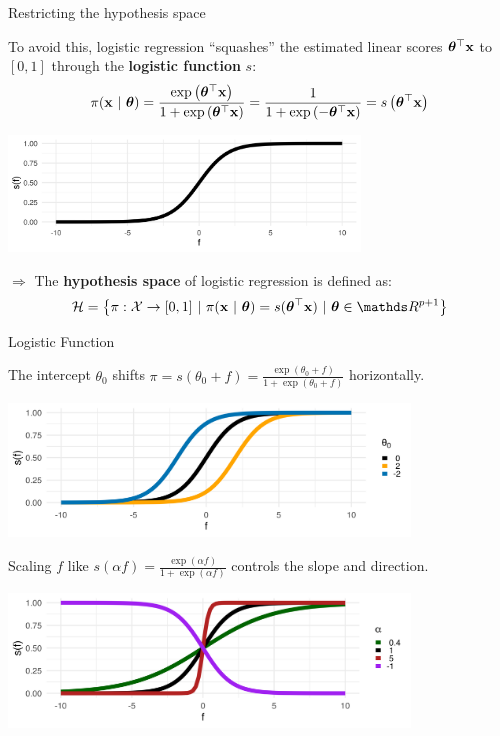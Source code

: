 \documentclass[11pt,compress,t,notes=noshow, xcolor=table]{beamer}
\begin{document}
\begin{vbframe}{Restricting the hypothesis space}

To avoid this, logistic regression \enquote{squashes} the estimated linear scores $\bm{\theta}^\top \mathbf{x}$ to $[0,1]$ through the \textbf{logistic function} $s$:
\[
\pi(\mathbf{x}~|~ \bm{\theta}) = \frac{\exp\left( \bm{\theta}^\top \mathbf{x} \right)}{1+\exp\left(\bm{\theta}^\top \mathbf{x} \right)} = \frac{1}{1+\exp\left( -\bm{\theta}^\top \mathbf{x} \right)} = s\left( \bm{\theta}^\top \mathbf{x} \right)
\]

\begin{center}
  \includegraphics[width=0.70\textwidth]{figure/logistic_function.png} 
\end{center}

$\Rightarrow$ The \textbf{hypothesis space} of logistic regression is defined as:
\begin{eqnarray*}
  \Hspace = \left\{\pi: \Xspace \to [0,1] ~|~\pixt = s(\thx) ~|~ \thetav \in \R^{p+1} \right\}
\end{eqnarray*}

\end{vbframe}

\begin{vbframe}{Logistic Function}

The intercept $\theta_0$ shifts $\pi = s(\theta_0 + f) = \frac{\exp(\theta_0 + f)}{1+\exp(\theta_0 + f)}$ horizontally.

{
\centering \includegraphics[width=0.8\textwidth]{figure/logistic_shifted.png}
}

Scaling $f$ like $s(\alpha f) = \frac{\exp(\alpha f)}{1+\exp(\alpha f)}$ controls the slope and direction.

{
\centering \includegraphics[width=0.8\textwidth]{figure/logistic_scaled.png}
}

\end{vbframe}
\end{document}
